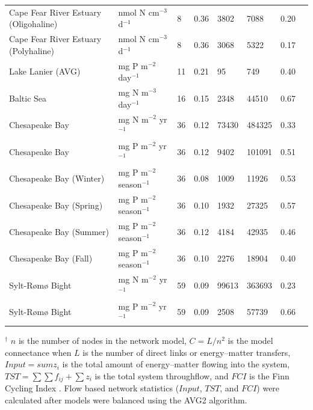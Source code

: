 \documentclass[article]{jss}
\begin{document}
\begin{table}[ht]
\begin{center}
\begin{tiny}
\begin{tabularx}{\textwidth}{llllllll}
      Cape Fear River Estuary (Oligohaline) & nmol N cm$^{-3}$ d$^{-1}$ &   8 & 0.36 & 3802 & 7088 & 0.20 & \citet{hines12} \\
      Cape Fear River Estuary (Polyhaline) & nmol N cm$^{-3}$ d$^{-1}$ &   8 & 0.36 & 3068 & 5322 & 0.17 & \citet{hines15} \\
      Lake Lanier (AVG) & mg P m$^{-2}$ day$^{-1}$ &  11 & 0.21 &  95 & 749 & 0.40 & \citet{borrett07_lanier} \\
      Baltic Sea & mg N m$^{-3}$ day$^{-1}$  &  16 & 0.15 & 2348 & 44510 & 0.67 & \citet{hinrichsen98_baltic} \\
      Chesapeake Bay & mg N m$^{-2}$ yr$^{-1}$  &  36 & 0.12 & 73430 & 484325 & 0.33 & \citet{baird95} \\
      Chesapeake Bay & mg P m$^{-2}$ yr$^{-1}$ &  36 & 0.12 & 9402 & 101091 & 0.51 & \citet{ulanowicz99} \\
      Chesapeake Bay (Winter) & mg P m$^{-2}$ season$^{-1}$ &  36 & 0.08 & 1009 & 11926 & 0.53 & \citet{ulanowicz99} \\
      Chesapeake Bay (Spring) & mg P m$^{-2}$ season$^{-1}$ &  36 & 0.10 & 1932 & 27325 & 0.57 & \citet{ulanowicz99} \\
      Chesapeake Bay (Summer) & mg P m$^{-2}$ season$^{-1}$ &  36 & 0.12 & 4184 & 42935 & 0.46 & \citet{ulanowicz99} \\
      Chesapeake Bay (Fall) & mg P m$^{-2}$ season$^{-1}$ &  36 & 0.10 & 2276 & 18904 & 0.40 & \citet{ulanowicz99} \\
      Sylt-R{\o}m{\o} Bight & mg N m$^{-2}$ yr$^{-1}$  &  59 & 0.09 & 99613 & 363693 & 0.23 & \citet{baird08_sylt} \\
      Sylt-R{\o}m{\o} Bight & mg P m$^{-2}$ yr$^{-1}$  &  59 & 0.09 & 2508 & 57739 & 0.66 & \citet{baird08_sylt} \\
      \hline
    \end{tabularx}
  \end{tiny}
\end{center}
\begin{scriptsize}
  $^\dagger$ $n$ is the number of nodes in the network model,
  $C=L/n^2$ is the model connectance when $L$ is the number of direct
  links or energy--matter transfers, $Input =sum{z_i}$ is the total
  amount of energy--matter flowing into the system,
  $TST=\sum\sum{f_{ij}}+\sum{z_i}$ is the total system throughflow,
  and $FCI$ is the Finn Cycling Index \citep{finn80}. Flow based
  network statistics ($Input$, $TST$, and $FCI$) were calculated after
  models were balanced using the AVG2 algorithm.
\end{scriptsize}
\end{table}
\end{document}
